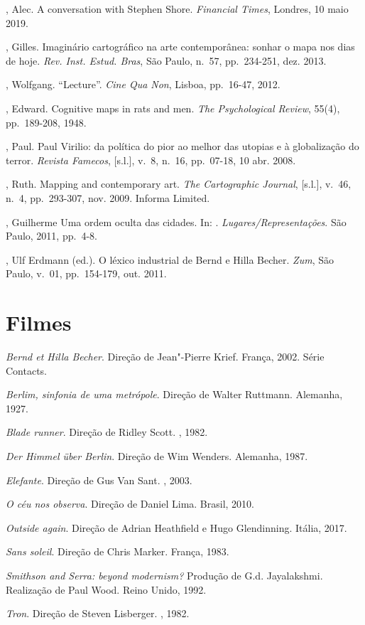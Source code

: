 \begin{Parskip}
, Alec. A conversation with Stephen Shore. \emph{Financial Times},
Londres, 10 maio 2019.

, Gilles. Imaginário cartográfico na arte contemporânea:
sonhar o mapa nos dias de hoje. \emph{Rev. Inst. Estud. Bras}, São
Paulo, n.~57, pp.~234-251, dez. 2013.

, Wolfgang. ``Lecture''. \emph{Cine Qua Non}, Lisboa, pp.~16-47,
2012.

, Edward. Cognitive maps in rats and men. \emph{The Psychological Review}, 55(4), pp.~189-208, 1948.

, Paul. Paul Virilio: da política do pior ao melhor das utopias e
à globalização do terror. \emph{Revista Famecos}, {[}s.l.{]}, v.~8, n.~16, pp.~07-18, 10 abr. 2008.

, Ruth. Mapping and contemporary art. \emph{The Cartographic
Journal}, {[}s.l.{]}, v.~46, n.~4, pp.~293-307, nov. 2009. Informa 
Limited.

, Guilherme Uma ordem oculta das cidades. In: .
\emph{Lugares/Representações}. São Paulo, 2011, pp.~4-8.

, Ulf Erdmann (ed.). O léxico industrial de Bernd e Hilla Becher.
\emph{Zum}, São Paulo, v.~01, pp.~154-179, out. 2011.
\end{Parskip}

\pagebreak

\section{Filmes}

\begin{Parskip}
\emph{Bernd et Hilla Becher}. Direção de Jean"-Pierre Krief. França, 2002. Série
Contacts.

\emph{Berlim, sinfonia de uma metrópole}. Direção de Walter Ruttmann. Alemanha,
1927.

\emph{Blade runner}. Direção de Ridley Scott. , 1982.

\emph{Der Himmel über Berlin}. Direção de Wim Wenders. Alemanha, 1987.

\emph{Elefante}. Direção de Gus Van Sant. , 2003.

\emph{O céu nos observa}. Direção de Daniel Lima. Brasil, 2010. %

\emph{Outside again}. Direção de Adrian Heathfield e Hugo Glendinning. Itália, 2017.

\emph{Sans soleil}. Direção de Chris Marker. França, 1983.

\emph{Smithson and Serra: beyond modernism?} Produção de G.d. Jayalakshmi.
Realização de Paul Wood. Reino Unido, 1992.

\emph{Tron}. Direção de Steven Lisberger. , 1982.
\end{Parskip}
